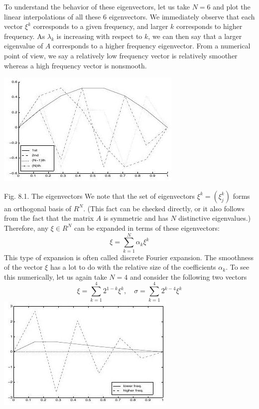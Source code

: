 \documentclass[10pt]{article}
\begin{document}
To understand the behavior of these eigenvectors, let us take $N=6$ and plot the linear interpolations of all these 6 eigenvectors. We immediately observe that each vector $\xi^{k}$ corresponds to a given frequency, and larger $k$ corresponds to higher frequency. As $\lambda_{k}$ is increasing with respect to $k$, we can then say that a larger eigenvalue of $A$ corresponds to a higher frequency eigenvector. From a numerical point of view, we say a relatively low frequency vector is relatively smoother whereas a high frequency vector is nonsmooth.

\includegraphics[max width=\textwidth]{2022_01_06_7eec630b8b060fb00b5bg-03}

Fig. 8.1. The eigenvectors We note that the set of eigenvectors $\xi^{k}=\left(\xi_{j}^{k}\right)$ forms an orthogonal basis of $R^{N}$. (This fact can be checked directly, or it also follows from the fact that the matrix $A$ is symmetric and has $N$ distinctive eigenvalues.) Therefore, any $\xi \in R^{N}$ can be expanded in terms of these eigenvectors:
$$
\xi=\sum_{k=1}^{N} \alpha_{k} \xi^{k}
$$
This type of expansion is often called discrete Fourier expansion. The smoothness of the vector $\xi$ has a lot to do with the relative size of the coefficients $\alpha_{k}$. To see this numerically, let us again take $N=4$ and consider the following two vectors
$$
\xi=\sum_{k=1}^{4} 2^{1-k} \xi^{k}, \quad \sigma=\sum_{k=1}^{4} 2^{k-4} \xi^{k}
$$
\includegraphics[max width=\textwidth]{2022_01_06_7eec630b8b060fb00b5bg-04}
\end{document}
